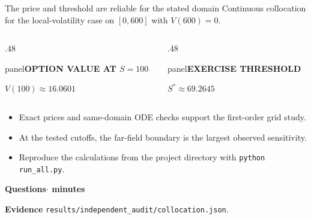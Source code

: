 \documentclass[aspectratio=169,11pt]{beamer}
\newcommand{\panel}[1]{%
  \begin{beamercolorbox}[wd=\linewidth,sep=2.2mm]{panel}#1\end{beamercolorbox}}
\newcommand{\labeltext}[1]{{\footnotesize\bfseries\color{Teal}#1}}
\newcommand{\sourcefile}[1]{\par\vfill{\scriptsize\color{Muted}#1\par}}
\begin{document}
\begin{frame}[t]{The price and threshold are reliable for the stated domain}
  \small
  Continuous collocation for the local-volatility case on $[0,600]$ with $V(600)=0$.
  \medskip
  \begin{columns}[T,onlytextwidth]
    \begin{column}{.48\textwidth}
      \panel{\labeltext{OPTION VALUE AT $S=100$}\par\smallskip
        {\LARGE\bfseries $V(100)\approx16.0601$}}
    \end{column}
    \begin{column}{.48\textwidth}
      \panel{\labeltext{EXERCISE THRESHOLD}\par\smallskip
        {\LARGE\bfseries $S^*\approx69.2645$}}
    \end{column}
  \end{columns}
  \medskip
  \begin{itemize}
    \item Exact prices and same-domain ODE checks support the first-order grid study.
    \item At the tested cutoffs, the far-field boundary is the largest observed sensitivity.
    \item Reproduce the calculations from the project directory with \texttt{python run\_all.py}.
  \end{itemize}
  \vfill
  {\large\bfseries\color{Teal} Questions\enspace $\cdot$ minutes\par}
  \sourcefile{\textbf{Evidence} \enspace \texttt{results/independent\_audit/collocation.json}.}
\end{frame}
\end{document}
